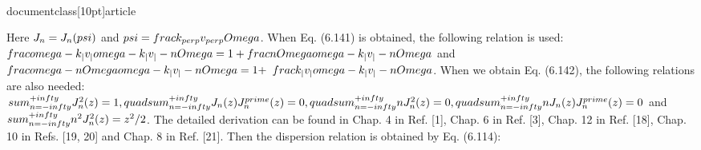 \\documentclass[10pt]{article}
\begin{document}
{{{{Here $J_{n}=J_{n}(\\psi)$ and $\\psi=\\frac{k_{\\perp} v_{\\perp}}{\\Omega}$. When Eq. (6.141) is obtained, the following relation is used: $\\frac{\\omega-k_{\\|} v_{\\|}}{\\omega-k_{\\|} v_{\\|}-n \\Omega}=1+\\frac{n \\Omega}{\\omega-k_{\\|} v_{\\|}-n \\Omega}$ and $\\frac{\\omega-n \\Omega}{\\omega-k_{\\|} v_{\\|}-n \\Omega}=1+$ $\\frac{k_{\\|} v_{\\|}}{\\omega-k_{\\|} v_{\\|}-n \\Omega}$. When we obtain Eq. (6.142), the following relations are also needed: $\\sum_{n=-\\infty}^{+\\infty} J_{n}^{2}(z)=1, \\quad \\sum_{n=-\\infty}^{+\\infty} J_{n}(z) J_{n}^{\\prime}(z)=0, \\quad \\sum_{n=-\\infty}^{+\\infty} n J_{n}^{2}(z)=0, \\quad \\sum_{n=-\\infty}^{+\\infty} n J_{n}(z) J_{n}^{\\prime}(z)=0$ and $\\sum_{n=-\\infty}^{+\\infty} n^{2} J_{n}^{2}(z)=z^{2} / 2$. The detailed derivation can be found in Chap. 4 in Ref. [1], Chap. 6 in Ref. [3], Chap. 12 in Ref. [18], Chap. 10 in Refs. [19, 20] and Chap. 8 in Ref. [21]. Then the dispersion relation is obtained by Eq. (6.114):


}}}}
\end{document}

